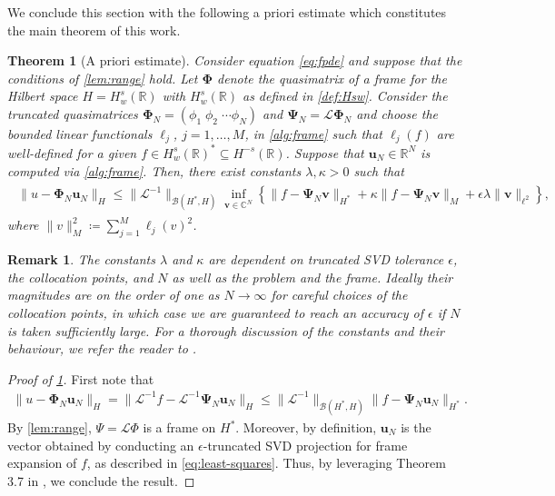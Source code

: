 \documentclass[10pt,a4paper]{article}
\newtheorem{theorem}{Theorem}[section]
\newtheorem{remark}{Remark}[section]
\numberwithin{equation}{section}
\begin{document}
We conclude this section with the following a priori estimate which constitutes the main theorem of this work.
\begin{theorem}[A priori estimate]
\label{th:apriori}
Consider equation \cref{eq:fpde} and suppose that the conditions of \cref{lem:range} hold. Let ${\bm \Phi}$ denote the quasimatrix of a frame for the Hilbert space $H = H^s_w(\mathbb{R})$ with $H^s_w(\mathbb{R})$ as defined in \cref{def:Hsw}. Consider the truncated quasimatrices ${\bm \Phi}_N = (\phi_1 \; \phi_2 \; \cdots \phi_N)$ and ${\bm \Psi}_N = \mathcal{L}{\bm \Phi}_N$ and choose the bounded linear functionals $\ell_j$, $j=1,\dots,M$, in \cref{alg:frame} such that $\ell_j(f)$ are well-defined for a given $f \in H^s_w(\mathbb{R})^* \subseteq H^{-s}(\mathbb{R})$. Suppose that ${\mathbf u}_N \in \mathbb{R}^N$ is computed via \cref{alg:frame}. Then, there exist constants $\lambda, \kappa > 0$ such that
\begin{align}
\begin{split}
\| u - {\bm \Phi}_N {\mathbf u}_N \|_{H}
 \leq \| \mathcal{L}^{-1}\|_{\mathcal{B}(H^*, H)}
 \inf_{{\mathbf v} \in \mathbb{C}^N} 
\left\{
\| f -  {\bm \Psi}_N {\mathbf v} \|_{H^*} + \kappa \| f -  {\bm \Psi}_N {\mathbf v} \|_M + \epsilon \lambda \| {\mathbf v}\|_{\ell^2}
 \right\},
\end{split}
\end{align}
where $\| v \|^2_M \coloneqq \sum_{j=1}^M \ell_j(v)^2$. 
\end{theorem}

\begin{remark}
The constants $\lambda$ and $\kappa$ are dependent on truncated SVD tolerance $\epsilon$, the collocation points, and $N$ as well as the problem and the frame. Ideally their magnitudes are on the order of one as $N \to \infty$ for careful choices of the collocation points, in which case we are guaranteed to reach an accuracy of $\epsilon$ if $N$ is taken sufficiently large. For a thorough discussion of the constants and their behaviour, we refer the reader to \cite{Adcock2020}.
\end{remark}

\begin{proof}[Proof of \cref{th:apriori}]
First note that
\begin{align}
\| u - {\bm \Phi}_N {\mathbf u}_N \|_{H} 
= \| \mathcal{L}^{-1} f - \mathcal{L}^{-1} {\bm \Psi}_N {\mathbf u}_N \|_{H}
\leq  \| \mathcal{L}^{-1}\|_{\mathcal{B}(H^*, H)} \|  f - {\bm \Psi}_N {\mathbf u}_N \|_{H^*}.
\end{align}
By \cref{lem:range}, $\Psi = \mathcal{L}\Phi$ is a frame on $H^*$. Moreover, by definition, ${\mathbf u}_N$ is the vector obtained by conducting an $\epsilon$-truncated SVD projection for frame expansion of $f$, as described in \cref{eq:least-squares}. Thus, by leveraging Theorem 3.7 in \cite{Adcock2020}, we conclude the result.
\end{proof}
\end{document}
